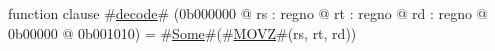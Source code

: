 function clause #\hyperref[zdecode]{decode}# (0b000000 @ rs : regno @ rt : regno @ rd : regno @ 0b00000 @ 0b001010) =
  #\hyperref[zSome]{Some}#(#\hyperref[zMOVZ]{MOVZ}#(rs, rt, rd))
